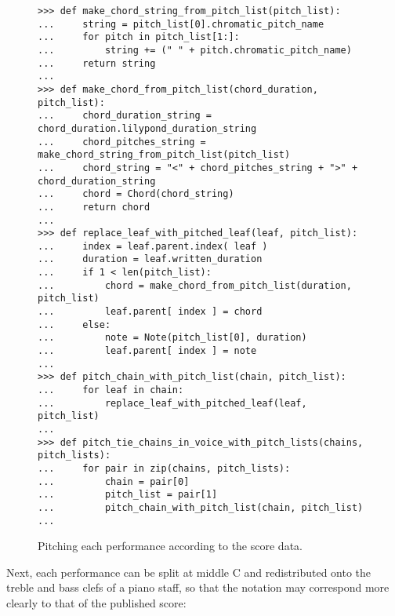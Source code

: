 \begin{figure}[H]
\begin{lstlisting}[basicstyle=\scriptsize\ttfamily, breaklines=True, tabsize=4, showtabs=false, showspaces=false]
>>> def make_chord_string_from_pitch_list(pitch_list):
...     string = pitch_list[0].chromatic_pitch_name
...     for pitch in pitch_list[1:]:
...         string += (" " + pitch.chromatic_pitch_name)
...     return string
... 
>>> def make_chord_from_pitch_list(chord_duration, pitch_list):
...     chord_duration_string = chord_duration.lilypond_duration_string
...     chord_pitches_string = make_chord_string_from_pitch_list(pitch_list)
...     chord_string = "<" + chord_pitches_string + ">" + chord_duration_string     
...     chord = Chord(chord_string)
...     return chord
... 
>>> def replace_leaf_with_pitched_leaf(leaf, pitch_list):
...     index = leaf.parent.index( leaf )
...     duration = leaf.written_duration
...     if 1 < len(pitch_list):
...         chord = make_chord_from_pitch_list(duration, pitch_list)
...         leaf.parent[ index ] = chord
...     else:
...         note = Note(pitch_list[0], duration)
...         leaf.parent[ index ] = note 
... 
>>> def pitch_chain_with_pitch_list(chain, pitch_list):
...     for leaf in chain:
...         replace_leaf_with_pitched_leaf(leaf, pitch_list)
... 
>>> def pitch_tie_chains_in_voice_with_pitch_lists(chains, pitch_lists):
...     for pair in zip(chains, pitch_lists):
...         chain = pair[0]
...         pitch_list = pair[1]
...         pitch_chain_with_pitch_list(chain, pitch_list)
... \end{lstlisting}

\caption{Pitching each performance according to the score data. } 
\end{figure}

Next, each performance can be split at middle C and redistributed onto the treble and bass clefs of a piano staff, so that the notation may correspond more clearly to that of the published score:

